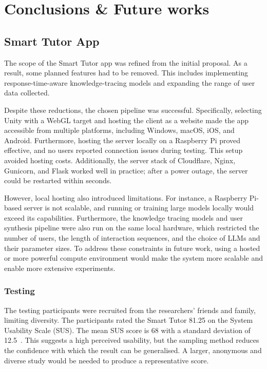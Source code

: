 \chapter{Conclusions \& Future works}

\section{Smart Tutor App}
The scope of the Smart Tutor app was refined from the initial proposal. As a result, some planned features had to be removed. This includes implementing response-time-aware knowledge-tracing models and expanding the range of user data collected.

Despite these reductions, the chosen pipeline was successful. Specifically, selecting Unity with a WebGL target and hosting the client as a website made the app accessible from multiple platforms, including Windows, macOS, iOS, and Android. Furthermore, hosting the server locally on a Raspberry Pi proved effective, and no users reported connection issues during testing. This setup avoided hosting costs. Additionally, the server stack of Cloudflare, Nginx, Gunicorn, and Flask worked well in practice; after a power outage, the server could be restarted within seconds.

However, local hosting also introduced limitations. For instance, a Raspberry Pi-based server is not scalable, and running or training large models locally would exceed its capabilities. Furthermore, the knowledge tracing models and user synthesis pipeline were also run on the same local hardware, which restricted the number of users, the length of interaction sequences, and the choice of LLMs and their parameter sizes. To address these constraints in future work, using a hosted or more powerful compute environment would make the system more scalable and enable more extensive experiments.

\subsection{Testing}
The testing participants were recruited from the researchers' friends and family, limiting diversity. The participants rated the Smart Tutor 81.25 on the System Usability Scale (SUS). The mean SUS score is 68 with a standard deviation of 12.5~\autocite{SUS_average}. This suggests a high perceived usability, but the sampling method reduces the confidence with which the result can be generalised. A larger, anonymous and diverse study would be needed to produce a representative score.


